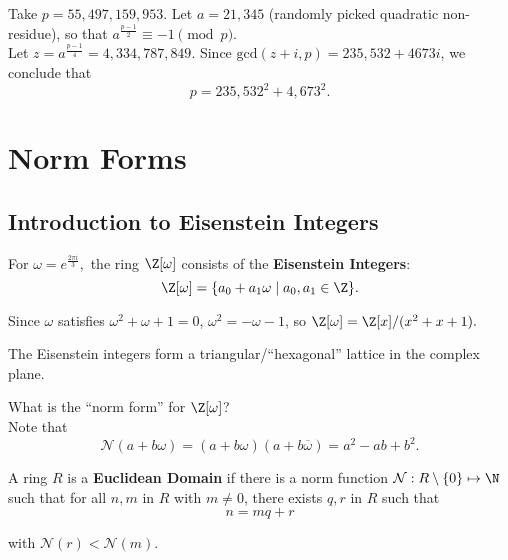 \documentclass[11pt]{article}
\begin{document}
\begin{eg}
Take $p = 55, 497, 159, 953$. Let $a = 21, 345$ (randomly picked quadratic non-residue), so that $a^{\frac{p-1}{2}} \equiv -1 \pmod p$. \\

Let $z = a^{\frac{p-1}{4}} = 4,334,787,849.$ Since $\mathrm{gcd}(z+i, p) = 235,532 + 4673i$, we conclude that
\[
    p = 235,532^2 + 4,673^2.
\] 
\end{eg}

\section{Norm Forms}
\subsection{Introduction to Eisenstein Integers}

\begin{definition}
For $\omega = e^{\frac{2\pi i}{3}},$ the ring $\Z[\omega]$ consists of the \textbf{Eisenstein Integers}:
\[
    \Z[\omega] = \{ a_0 + a_1 \omega \mid a_0, a_1 \in \Z \}.
\] 

Since $\omega$ satisfies $\omega^2 + \omega + 1 = 0$, $\omega^2 = -\omega - 1$, so $\Z[\omega] = \Z[x] / (x^2 + x + 1).$
\end{definition}

\begin{remark}
The Eisenstein integers form a triangular/``hexagonal'' lattice in the complex plane.
\end{remark}

\begin{exercise}
What is the ``norm form'' for $\Z[\omega]$? \\

Note that 
\[
    \mathcal{N}(a + b\omega) = (a+b\omega)(a+b \overline{\omega}) = a^2 - ab + b^2.
\]
\end{exercise}

\begin{definition}
A ring $R$ is a \textbf{Euclidean Domain} if there is a norm function $\mathcal{N}: R \setminus \{ 0 \} \mapsto \N$
such that for all $n, m$ in $R$ with $m \neq 0$, there exists $q, r$ in $R$ such that
\[
    n = mq + r
\]

with $\mathcal{N}(r) < \mathcal{N}(m).$
\end{definition}
\end{document}
